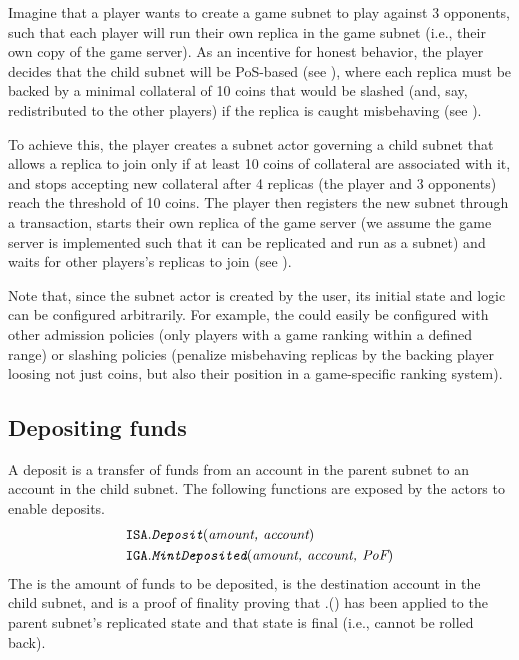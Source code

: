 \begin{example}
\label{ex:create-game-subnet}

Imagine that a player wants to create a game subnet to play against 3 opponents,
such that each player will run their own replica in the game subnet (i.e., their own copy of the game server).
As an incentive for honest behavior, the player decides that the child subnet will be PoS-based (see ),
where each replica must be backed by a minimal collateral of 10 coins that would be slashed (and, say, redistributed to the other players) if the replica is caught misbehaving (see ).

To achieve this, the player creates a subnet actor governing a child subnet that allows a replica to join only if at least 10 coins of collateral are associated with it, and 
stops accepting new collateral after 4 replicas (the player and 3 opponents) reach the threshold of 10 coins.
The player then registers the new subnet through a  transaction, starts their own replica of the game server (we assume the game server is implemented such that it can be replicated and run as a subnet)
and waits for other players's replicas to join (see ).

Note that, since the subnet actor is created by the user, its initial state and logic can be configured arbitrarily.
For example, the \sa could easily be configured with other admission policies (only players with a game ranking within a defined range)
or slashing policies (penalize misbehaving replicas by the backing player loosing not just coins, but also their position in a game-specific ranking system).

\end{example}

\subsection{Depositing funds}
\label{sec:deposit}

A deposit is a transfer of funds from an account in the parent subnet to an account in the child subnet.
The following functions are exposed by the \ipc actors to enable deposits.
\begin{align*}
    \texttt{ISA}.&\textit{\texttt{Deposit}}(\textit{amount, account})\\
    \texttt{IGA}.&\textit{\texttt{MintDeposited}}(\textit{amount, account, \textit{PoF}})
\end{align*}
The  is the amount of funds to be deposited,  is the destination account in the child subnet, and \funcParam{\pof} is a proof of finality proving that \sa.() has been applied to the parent subnet's replicated state and that state is final (i.e., cannot be rolled back).

